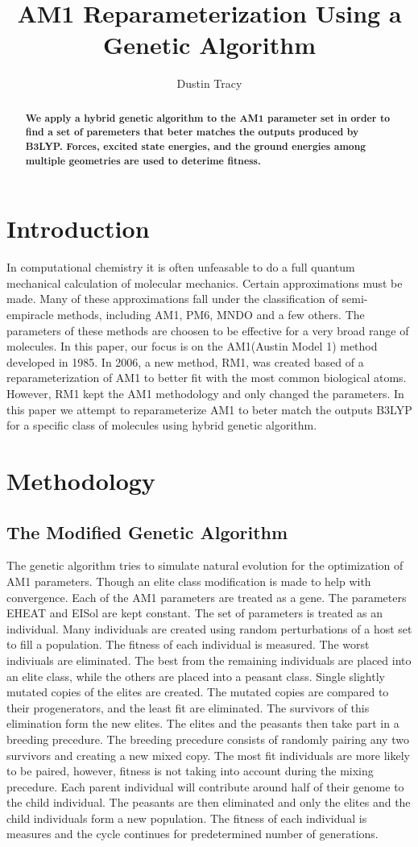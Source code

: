\documentclass[11pt, twocolumn]{article}
\title{AM1 Reparameterization Using a Genetic Algorithm}
\author{Dustin Tracy}
\begin{document}
\maketitle
\begin{abstract}
\textbf{We apply a hybrid genetic algorithm to the AM1 parameter set in order to find a set of paremeters that beter matches the outputs produced by B3LYP\@.
Forces, excited state energies, and the ground energies among multiple geometries are used to deterime fitness.}
\end{abstract}
\section{Introduction}
In computational chemistry it is often unfeasable to do a full quantum mechanical calculation of molecular mechanics.
Certain approximations must be made.
Many of these approximations fall under the classification of semi-empiracle methods, including AM1, PM6, MNDO and a few others.
The parameters of these methods are choosen to be effective for a very broad range of molecules.
In this paper, our focus is on the AM1(Austin Model 1) method developed in 1985.
In 2006, a new method, RM1, was created based of a reparameterization of AM1 to better fit with the most common biological atoms.
However, RM1 kept the AM1 methodology and only changed the parameters.
In this paper we attempt to reparameterize AM1 to beter match the outputs B3LYP for a specific class of molecules using hybrid genetic algorithm.
\section{Methodology}
\subsection{The Modified Genetic Algorithm}
The genetic algorithm tries to simulate natural evolution for the optimization of AM1 parameters.
Though an elite class modification is made to help with convergence.
Each of the AM1 parameters are treated as a gene. 
The parameters EHEAT and EISol are kept constant.
The set of parameters is treated as an individual.
Many individuals are created using random perturbations of a host set to fill a population.
The fitness of each individual is measured.
The worst indiviuals are eliminated.
The best from the remaining individuals are placed into an elite class, while the others are placed into a peasant class.
Single slightly mutated copies of the elites are created.
The mutated copies are compared to their progenerators, and the least fit are eliminated.
The survivors of this elimination form the new elites.
The elites and the peasants then take part in a breeding precedure.
The breeding precedure consists of randomly pairing any two survivors and creating a new mixed copy.
The most fit individuals are more likely to be paired, however, fitness is not taking into account during the mixing precedure.
Each parent individual will contribute around half of their genome to the child individual.
The peasants are then eliminated and only the elites and the child individuals form a new population.
The fitness of each individual is measures and the cycle continues for predetermined number of generations.
\end{document}
